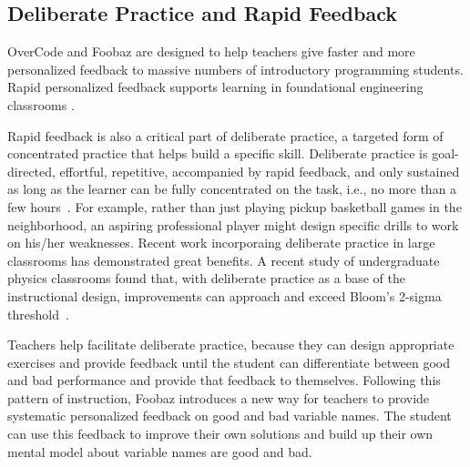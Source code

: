 \subsection{Deliberate Practice and Rapid Feedback}


OverCode and Foobaz are designed to help teachers give faster and more personalized feedback to massive numbers of introductory programming students. Rapid personalized feedback supports learning in foundational engineering classrooms \cite{ieeeRapidFeedback}. 

Rapid feedback is also a critical part of deliberate practice, a targeted form of concentrated practice that helps build a specific skill. Deliberate practice is goal-directed, effortful, repetitive, accompanied by rapid feedback, and only sustained as long as the learner can be fully concentrated on the task, i.e., no more than a few hours~\cite{Gobet2012}. For example, rather than just playing pickup basketball games in the neighborhood, an aspiring professional player might design specific drills to work on his/her weaknesses. Recent work incorporaing deliberate practice in large classrooms has demonstrated great benefits. A recent study of undergraduate physics classrooms found that, with deliberate practice as a base of the instructional design, improvements can approach and exceed Bloom's 2-sigma threshold~\cite{Deslauriers862}.

Teachers help facilitate deliberate practice, because they can design appropriate exercises and provide feedback until the student can differentiate between good and bad performance and provide that feedback to themselves. Following this pattern of instruction, Foobaz introduces a new way for teachers to provide systematic personalized feedback on good and bad variable names. The student can use this feedback to improve their own solutions and build up their own mental model about variable names are good and bad.



